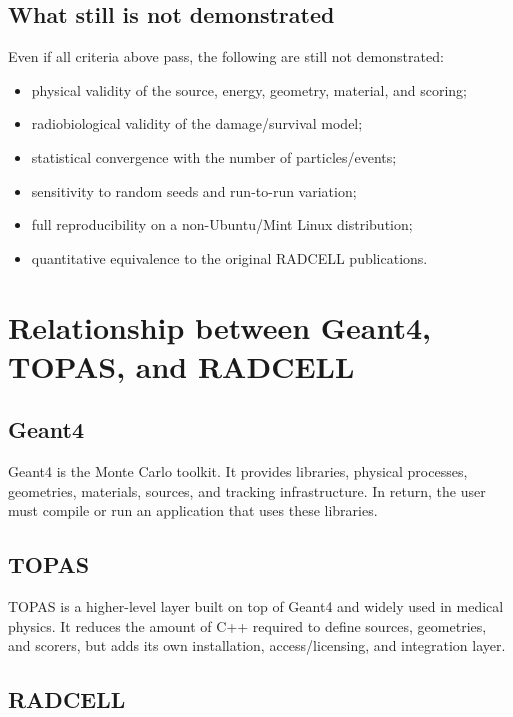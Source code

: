 \documentclass[11pt,a4paper,twoside,pdftex]{refrep}
\begin{document}
\section{What still is not demonstrated}

Even if all criteria above pass, the following are still not demonstrated:

\begin{itemize}
  \item physical validity of the source, energy, geometry, material, and scoring;
  \item radiobiological validity of the damage/survival model;
  \item statistical convergence with the number of particles/events;
  \item sensitivity to random seeds and run-to-run variation;
  \item full reproducibility on a non-Ubuntu/Mint Linux distribution;
  \item quantitative equivalence to the original RADCELL publications.
\end{itemize}

\chapter{Relationship between Geant4, TOPAS, and RADCELL}

\section{Geant4}

Geant4 is the Monte Carlo toolkit. It provides libraries, physical processes, geometries, materials, sources, and tracking infrastructure. In return, the user must compile or run an application that uses these libraries.

\section{TOPAS}

TOPAS is a higher-level layer built on top of Geant4 and widely used in medical physics. It reduces the amount of C++ required to define sources, geometries, and scorers, but adds its own installation, access/licensing, and integration layer.

\section{RADCELL}
\end{document}
